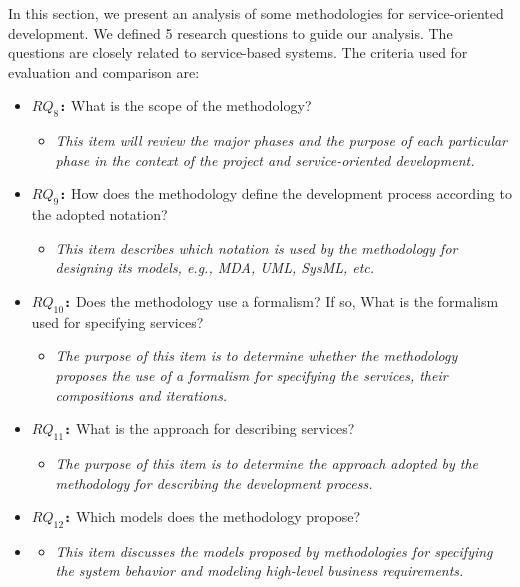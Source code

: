 In this section, we present an analysis of some methodologies for
service-oriented development. We defined 5 research questions to guide our analysis. The questions are closely related to service-based
systems. The criteria used for evaluation and comparison are:






\begin{itemize} 

 \item \textbf{\texttt{$RQ_8$:}} What is the scope of the methodology?
 	\begin{itemize}
	  \item \textit{This item will review the major phases and
  the purpose of each particular phase in the context of the project and
  service-oriented development.}
	\end{itemize}
  \item \textbf{\texttt{$RQ_9$:}} 
  How does the methodology define the development process according to the
  adopted notation?
  \begin{itemize}
	  \item \textit{This item describes which notation is used by the methodology
	  for designing its models, e.g., MDA, UML, SysML, etc.}
	\end{itemize}	
  \item \textbf{\texttt{$RQ_{10}$:}} Does the methodology use a formalism?
  If so, What is the formalism used for specifying services? 
\begin{itemize}
	  \item \textit{ The purpose of this item is to determine whether the
	  methodology proposes the use of a formalism for specifying
  the services, their compositions and iterations.}
	\end{itemize}  
  \item \textbf{\texttt{$RQ_{11}$:}} What is the approach for describing
  services?
\begin{itemize}
	  \item \textit{ The purpose of this item is to determine the approach
	  adopted by the methodology for describing the development process.}
	\end{itemize}
	  \item \textbf{\texttt{$RQ_{12}$:}} Which models does the methodology
	  propose?
	  \item {} 
	\begin{itemize}
	  \item \textit{This item discusses the models proposed by
  methodologies for specifying the system behavior and modeling
  high-level business requirements.}
	\end{itemize} 
\end{itemize}


